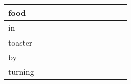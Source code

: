 \documentclass[landscape]{article}
\newcommand{\ssp}{\hspace{2pt}}
\begin{document}
\begin{tabular}{|l|p{10pt}|p{10pt}|p{10pt}|p{10pt}|p{10pt}|p{10pt}|p{10pt}|p{10pt}|p{10pt}|p{10pt}|p{10pt}|}
\hline
\ssp food \ssp&\hspace{2pt}&\hspace{2pt}&\hspace{2pt}&\hspace{2pt}&\hspace{2pt}&\hspace{2pt}&\hspace{2pt}&\hspace{2pt}&\hspace{2pt}&\hspace{2pt}&\hspace{2pt}\\
\hline
\ssp in \ssp&\hspace{2pt}&\hspace{2pt}&\hspace{2pt}&\hspace{2pt}&\hspace{2pt}&\hspace{2pt}&\hspace{2pt}&\hspace{2pt}&\hspace{2pt}&\hspace{2pt}&\hspace{2pt}\\
\hline
\ssp toaster \ssp&\hspace{2pt}&\hspace{2pt}&\hspace{2pt}&\hspace{2pt}&\hspace{2pt}&\hspace{2pt}&\hspace{2pt}&\hspace{2pt}&\hspace{2pt}&\hspace{2pt}&\hspace{2pt}\\
\hline
\ssp by \ssp&\hspace{2pt}&\hspace{2pt}&\hspace{2pt}&\hspace{2pt}&\hspace{2pt}&\hspace{2pt}&\hspace{2pt}&\hspace{2pt}&\hspace{2pt}&\hspace{2pt}&\hspace{2pt}\\
\hline
\ssp turning \ssp&\hspace{2pt}&\hspace{2pt}&\hspace{2pt}&\hspace{2pt}&\hspace{2pt}&\hspace{2pt}&\hspace{2pt}&\hspace{2pt}&\hspace{2pt}&\hspace{2pt}&\hspace{2pt}\\

\end{tabular}
\end{document}
